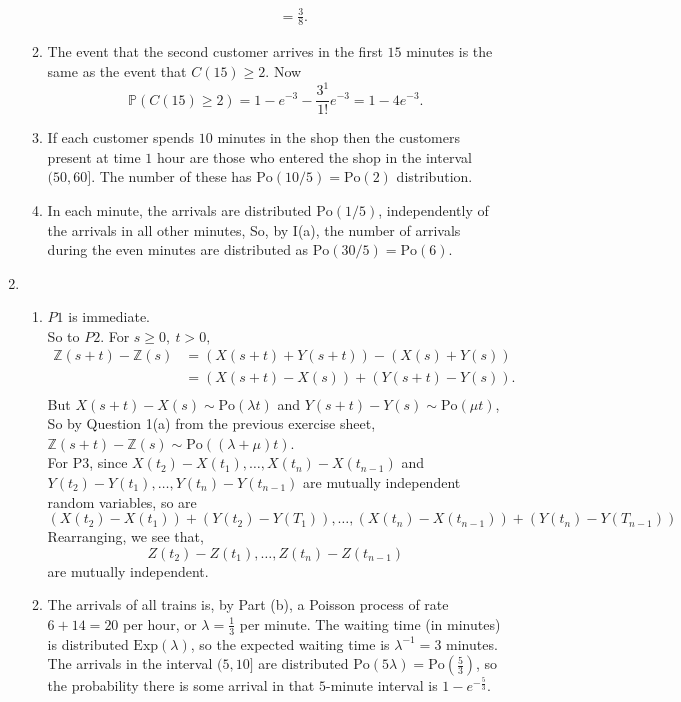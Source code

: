 \documentclass[11pt,a4paper]{article}
\begin{document}
\begin{enumerate}
\begin{enumerate}
\begin{enumerate}
\begin{align*}
                    &= \frac{3}{8}.
                \end{align*}
            \end{enumerate}
            \item The event that the second customer arrives in the first $15$ minutes is the same as the event that $C(15) \geq 2$. Now
            $$\mathbb{P}(C(15)\geq 2) = 1-e^{-3}-\frac{3^1}{1!}e^{-3}=1-4e^{-3}.$$
            \item If each customer spends $10$ minutes in the shop then the customers present at time $1$ hour are those who entered the shop in the interval $(50, 60]$. The number of these has $\text{Po}(10/5) = \text{Po}(2)$ distribution.
            \item In each minute, the arrivals are distributed $\text{Po}(1/5)$, independently of the arrivals in all other minutes, So, by I(a), the number of arrivals during the even minutes are distributed as $\text{Po}(30/5) = \text{Po}(6)$.
        \end{enumerate}
        \item 
        \begin{enumerate}
            \item $P1$ is immediate.\\
            So to $P2$. For $s \geq 0,\ t > 0,$
            \begin{align*}
                \mathbb{Z}(s+t)-\mathbb{Z}(s)
                &= (X(s+t) + Y(s+t))-(X(s)+Y(s))\\
                &= (X(s+t)-X(s))+(Y(s+t)-Y(s)).\\
            \end{align*}
            But $X(s+t)-X(s) \sim \text{Po}(\lambda t)$ and $Y(s+t)-Y(s) \sim \text{Po}(\mu t)$, So by Question 1(a) from the previous exercise sheet, $\mathbb{Z}(s+t)-\mathbb{Z}(s)\sim \text{Po}((\lambda + \mu)t)$.\\
            For P3, since $X(t_2)-X(t_1),\ldots, X(t_n)-X(t_{n-1})$ and $Y(t_2)-Y(t_1),\ldots, Y(t_n)-Y(t_{n-1})$ are mutually independent random variables, so are
            $$
            (X(t_2)-X(t_1))+(Y(t_2)-Y(T_1)),\ldots,(X(t_n)-X(t_{n-1}))+(Y(t_n)-Y(T_{n-1}))
            $$
            Rearranging, we see that,
            $$
            Z(t_2)-Z(t_1), \ldots, Z(t_n)-Z(t_{n-1})
            $$
            are mutually independent.
            \item The arrivals of all trains is, by Part (b), a Poisson process of rate $6+14 = 20$ per hour, or $\lambda = \frac{1}{3}$ per minute. The waiting time (in minutes) is distributed $\text{Exp}(\lambda)$, so the expected waiting time is $\lambda^{-1} = 3$ minutes. The arrivals in the interval $(5, 10]$ are distributed $\text{Po}(5\lambda)=\text{Po}(\frac{5}{3})$, so the probability there is some arrival in that $5$-minute interval is $1-e^{-\frac{5}{3}}$.
        \end{enumerate}
        
    \end{enumerate}
\end{document}
